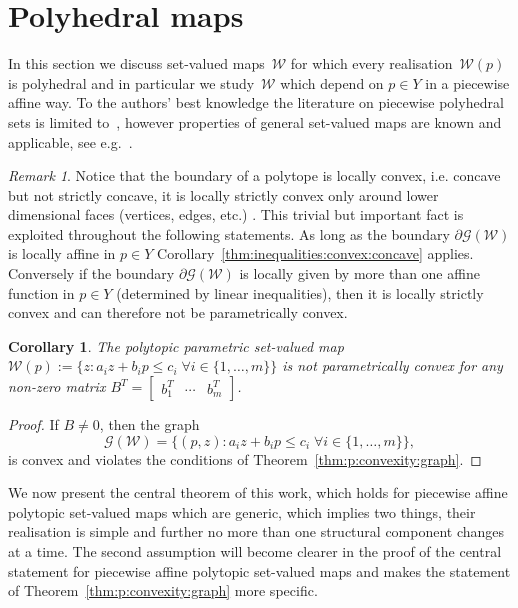 \documentclass{elsarticle}
\newcounter{thmcount}
\newtheorem{cor}[thmcount]{Corollary}
\theoremstyle{remark}
\newtheorem{rem}[thmcount]{Remark}
\theoremstyle{definition}
\begin{document}
\section{Polyhedral maps}\label{sec:polyhedral:maps}
%
%
%
%
In this section we discuss set-valued maps~$\mathcal W$ for which every realisation~$\mathcal W(p)$ is polyhedral and in particular we study~$\mathcal W$ which depend on $p\in Y$ in a piecewise affine way. 
%
To the authors' best knowledge the literature on piecewise polyhedral sets is limited to~\cite{Finzel:2000}, however properties of general set-valued maps are known and applicable, see e.g.~\cite{Aubin:2009}.
%
\begin{rem}
%
Notice that the boundary of a polytope is locally convex, i.e. concave but not strictly concave, it is locally strictly convex only around lower dimensional faces (vertices, edges, etc.) .
%
This trivial but important fact is exploited throughout the following statements. 
%
As long as the boundary $\partial\mathscr G(\mathcal W)$ is locally affine in $p\in Y$ Corollary~\ref{thm:inequalities:convex:concave} applies. 
%
Conversely if the boundary $\partial\mathscr G(\mathcal W)$ is locally given by more than one affine function in $p\in Y$ (determined by linear inequalities), then it is locally strictly convex and can therefore not be parametrically convex.
\end{rem}
%
\begin{cor}\label{thm:polytopic:set:not:p:convex}
The polytopic parametric set-valued map $\mathcal W(p):=\{z: a_i z + b_i p\leq c_i \; \forall i\in\{1,\dots,m\}\}$
is not parametrically convex for any non-zero matrix $B^T = [\begin{matrix} b_1^T & \cdots & b_m^T\end{matrix}]$.
\end{cor}
%
\begin{proof}
If $B\neq 0$, then the graph
%
\begin{equation*}
	\mathscr G(\mathcal W) = \{(p,z):a_i z + b_i p\leq c_i \; \forall i\in\{1,\dots,m\}\} ,
\end{equation*}
%
is convex and violates the conditions of Theorem~\ref{thm:p:convexity:graph}.
\end{proof}
%
We now present the central theorem of this work, which holds for piecewise affine polytopic set-valued maps which are generic, which implies two things, their realisation is simple and further no more than one structural component changes at a time. 
%
The second assumption will become clearer in the proof of the central statement for piecewise affine polytopic set-valued maps and makes the statement of Theorem~\ref{thm:p:convexity:graph} more specific.
\end{document}
